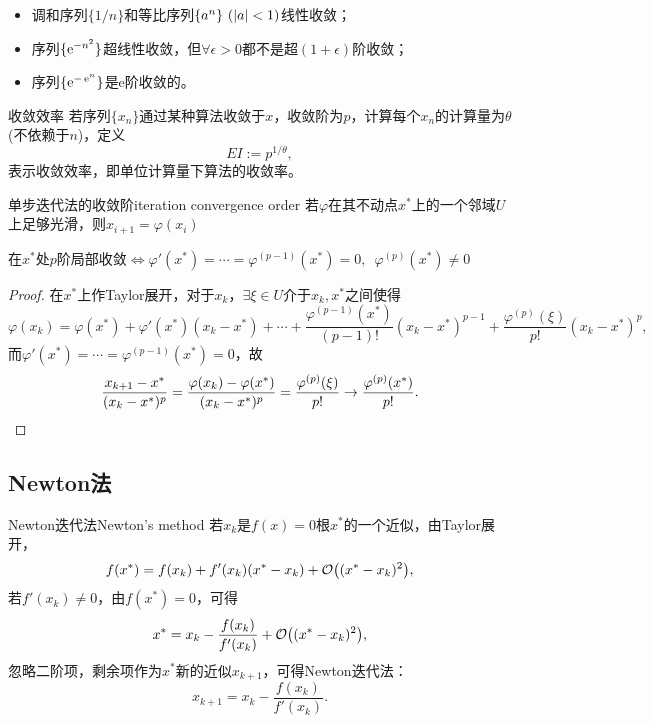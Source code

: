 \begin{example}
    {}{}
    \begin{itemize}
        \item 调和序列$\{1/n\}$和等比序列$\{a^n\}~(\left\lvert a\right\rvert<1)$线性收敛；
        \item 序列$\{\mathop{}\!\mathrm{e}^{-n^2}\}$超线性收敛，但$\forall\epsilon>0$都不是超$(1+\epsilon)$阶收敛；
        \item 序列$\{\mathop{}\!\mathrm{e}^{-\mathop{}\!\mathrm{e}^ n}\}$是e阶收敛的。
    \end{itemize}
\end{example}

\begin{definition}
    {收敛效率}{}
    若序列$\{x_n\}$通过某种算法收敛于$x$，收敛阶为$p$，计算每个$x_n$的计算量为$\theta$ (不依赖于$n$)，定义
    \[
        EI:=p^{1/\theta},
    \]
    表示收敛效率，即单位计算量下算法的收敛率。
\end{definition}

\begin{theorem}
    {单步迭代法的收敛阶}{iteration convergence order}
    若$\varphi$在其不动点$x^*$上的一个邻域$U$上足够光滑，则$x_{i+1}=\varphi(x_i)$
    \begin{center}
        在$x^*$处$p$阶局部收敛$\iff\varphi'(x^*)=\cdots=\varphi^{(p-1)}(x^*)=0,\enspace\varphi^{(p)}(x^*)\neq 0$
    \end{center}
\end{theorem}

\begin{proof}
    在$x^*$上作Taylor展开，对于$x_k$，$\exists\xi\in U$介于$x_k,x^*$之间使得
    \[
        \varphi(x_k)=\varphi(x^*)+\varphi'(x^*)(x_k-x^*)+\cdots+\frac{\varphi^{(p-1)}(x^*)}{(p-1)!}(x_k-x^*)^{p-1}+\frac{\varphi^{(p)}(\xi)}{p!}(x_k-x^*)^p,
    \]
    而$\varphi'(x^*)=\cdots=\varphi^{(p-1)}(x^*)=0$，故
    \[
        \frac{x_{k+1}-x^*}{(x_k-x^*)^p}=\frac{\varphi(x_k)-\varphi(x^*)}{(x_k-x^*)^p}
        =\frac{\varphi^{(p)}(\xi)}{p!}\to\frac{\varphi^{(p)}(x^*)}{p!}.
        \qedhere
    \]
\end{proof}

\subsection{Newton法}

\begin{theorem}
    {Newton迭代法}{Newton's method}
    若$x_k$是$f(x)=0$根$x^*$的一个近似，由Taylor展开，
    \[
        f(x^*)=f(x_k)+f'(x_k)(x^*-x_k)+\mathcal O\bigl((x^*-x_k)^2\bigr),
    \]
    若$f'(x_k)\neq 0$，由$f(x^*)=0$，可得 
    \[
        x^*=x_k-\frac{f(x_k)}{f'(x_k)}+\mathcal O\bigl((x^*-x_k)^2\bigr),
    \]
    忽略二阶项，剩余项作为$x^*$新的近似$x_{k+1}$，可得Newton迭代法：
    \begin{equation}
        \label{eqn:Newton iter}
        x_{k+1}=x_k-\frac{f(x_k)}{f'(x_k)}.
    \end{equation}
\end{theorem}

